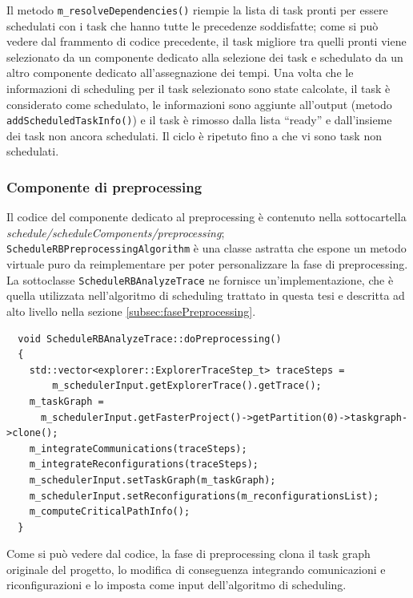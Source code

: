 Il metodo \verb+m_resolveDependencies()+ riempie la lista di task pronti per 
essere schedulati con i task che hanno tutte le precedenze soddisfatte; come si 
può vedere dal frammento di codice precedente, il task migliore tra quelli 
pronti viene selezionato da un componente dedicato alla selezione dei task e 
schedulato da un altro componente dedicato all'assegnazione dei tempi. Una 
volta che le informazioni di scheduling per il task selezionato sono state 
calcolate, il task è considerato come schedulato, le informazioni sono aggiunte 
all'output (metodo \verb+addScheduledTaskInfo()+) e il task è rimosso dalla 
lista ``ready'' e dall'insieme dei task non ancora schedulati. Il ciclo è 
ripetuto fino a che vi sono task non schedulati.

\subsubsection{Componente di preprocessing}
Il codice del componente dedicato al preprocessing è contenuto nella 
sottocartella \emph{schedule/scheduleComponents/preprocessing}; 
\verb+ScheduleRBPreprocessingAlgorithm+ è una classe astratta che espone un 
metodo virtuale puro da reimplementare per poter personalizzare la fase di 
preprocessing. La sottoclasse \verb+ScheduleRBAnalyzeTrace+ ne fornisce 
un'implementazione, che è quella utilizzata nell'algoritmo di scheduling 
trattato in questa tesi e descritta ad alto livello nella sezione 
\ref{subsec:fasePreprocessing}.
\newline
\begin{verbatim}
  void ScheduleRBAnalyzeTrace::doPreprocessing()
  {
    std::vector<explorer::ExplorerTraceStep_t> traceSteps = 
        m_schedulerInput.getExplorerTrace().getTrace();
    m_taskGraph = 
      m_schedulerInput.getFasterProject()->getPartition(0)->taskgraph->clone();
    m_integrateCommunications(traceSteps);
    m_integrateReconfigurations(traceSteps);
    m_schedulerInput.setTaskGraph(m_taskGraph);
    m_schedulerInput.setReconfigurations(m_reconfigurationsList);
    m_computeCriticalPathInfo();
  }
\end{verbatim}

Come si può vedere dal codice, la fase di preprocessing clona il task graph 
originale del progetto, lo modifica di conseguenza integrando comunicazioni e 
riconfigurazioni e lo imposta come input dell'algoritmo di scheduling.

